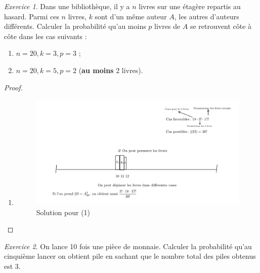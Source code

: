 \documentclass[french]{book}
\theoremstyle{definition}
\theoremstyle{remark}
\newtheorem{exo}{Exercice}
\begin{document}
\begin{exo}
  Dans une bibliothèque, il y a $n$ livres sur une étagère repartis au hasard. Parmi ces $n$ livres, $k$ sont d'un même auteur $A$, les autres d'auteurs différents. Calculer la probabilité qu'au moins $p$ livres de $A$ se retrouvent côte à côte dans les cas suivants :
  \begin{enumerate}
    \item $n=20, k=3, p=3$ ;
    \item $n=20, k=5, p=2$ (\textbf{au moins} 2 livres).
  \end{enumerate}
\end{exo}

\begin{proof}

  \

  \begin{enumerate}
    \item

    \begin{figure}[h!]
      \centering
      \includegraphics[scale=0.3]{figures/exo_livres.png}
      \caption{Solution pour (1)}
      \label{}
    \end{figure}

  \end{enumerate}
\end{proof}

\begin{exo}
  On lance 10 fois une pièce de monnaie. Calculer la probabilité qu'au cinquième lancer on obtient pile en sachant que le nombre total des piles obtenus est 3.
\end{exo}
\end{document}
